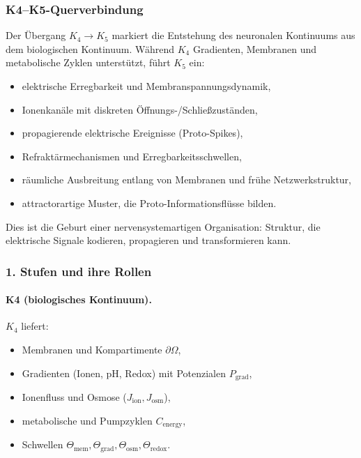 
\subsubsection{K4–K5-Querverbindung}
\label{sec:crossk-k4-k5}

Der Übergang $K_4 \rightarrow K_5$ markiert die Entstehung des neuronalen
Kontinuums aus dem biologischen Kontinuum. Während $K_4$ Gradienten,
Membranen und metabolische Zyklen unterstützt, führt $K_5$ ein:
\begin{itemize}
  \item elektrische Erregbarkeit und Membranspannungsdynamik,
  \item Ionenkanäle mit diskreten Öffnungs-/Schließzuständen,
  \item propagierende elektrische Ereignisse (Proto-Spikes),
  \item Refraktärmechanismen und Erregbarkeitsschwellen,
  \item räumliche Ausbreitung entlang von Membranen und frühe Netzwerkstruktur,
  \item attractorartige Muster, die Proto-Informationsflüsse bilden.
\end{itemize}

Dies ist die Geburt einer nervensystemartigen Organisation: Struktur, die elektrische
Signale kodieren, propagieren und transformieren kann.

\subsubsection{1. Stufen und ihre Rollen}

\paragraph{K4 (biologisches Kontinuum).}
$K_4$ liefert:
\begin{itemize}
  \item Membranen und Kompartimente $\partial\Omega$,
  \item Gradienten (Ionen, pH, Redox) mit Potenzialen $P_{\mathrm{grad}}$,
  \item Ionenfluss und Osmose ($J_{\mathrm{ion}}, J_{\mathrm{osm}}$),
  \item metabolische und Pumpzyklen $C_{\mathrm{energy}}$,
  \item Schwellen $\Theta_{\mathrm{mem}}, \Theta_{\mathrm{grad}},
        \Theta_{\mathrm{osm}}, \Theta_{\mathrm{redox}}$.
\end{itemize}

